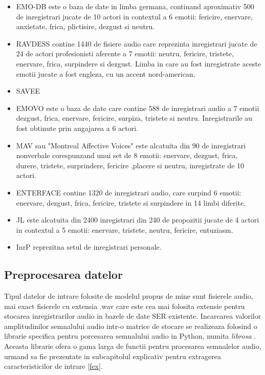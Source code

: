 \documentclass[a4paper,12pt]{book}
\begin{document}
					\begin{itemize}
						\item EMO-DB \cite{emodb} este o baza de date in limba germana, continand aproximativ 500 de inregistrari jucate de 10 actori in contextul a 6 emotii: fericire, enervare, anxietate, frica, plictisire, dezgust si neutru. 
						
						\item RAVDESS \cite{ravdess} contine 1440 de fisiere audio care reprezinta inregistrari jucate de 24 de actori profesionisti aferente a 7 emotii: neutru, fericire, tristete, enervare, frica, surpindere si dezgust. Limba in care au fost inregistrate aceste emotii jucate a fost engleza, cu un accent nord-american.
						
						\item SAVEE	
										
						\item EMOVO \cite{emovo} este o baza de date care contine 588 de inregistrari audio a 7 emotii dezgust, frica, enervare, fericire, surpiza, tristete si neutru. Inregistrarile au fost obtinute prin angajarea a 6 actori.
						
						\item MAV \cite{mav} sau "Montreal Affective Voices" este alcatuita din 90 de inregistrari nonverbale corespunzand unui set de 8 emotii: enervare, dezgust, frica, durere, tristete, surprindere, fericire ,placere si neutru, inregistrate de 10 actori.
						
						\item ENTERFACE \cite{enterface} contine 1320 de inregistrari audio, care surpind 6 emotii: enervare, dezgust, frica, fericire, tristete si surpindere in 14 limbi diferite.
						
						\item JL \cite{JL} este alcatuita din 2400 inregistrari din 240 de propozitii jucate de 4 actori in contextul a 5 emotii: enervare, tristete, neutru, fericire, entuziasm.
						
						\item InrP reprezitna setul de inregistrari personale.							
					\end{itemize}
				
				\subsection{Preprocesarea datelor}
					Tipul datelor de intrare folosite de modelul propus de mine sunt fisierele audio, mai exact fisierele cu extensia .wav care este cea mai folosita extensie pentru stocarea inregistrarilor audio in bazele de date SER existente. Incarcarea valorilor amplitudinilor semnalului audio intr-o matrice de stocare se realizeaza folosind o librarie specifica pentru porcesarea semnalului audio in Python, numita \textit{librosa} \cite{librosa}. Aceasta librarie ofera o gama larga de functii pentru procesarea semnalelor audio,  urmand sa fie prezentate in subcapitolul explicativ pentru extragerea caracteristicilor de intrare \ref{fex}.
					
\end{document}
